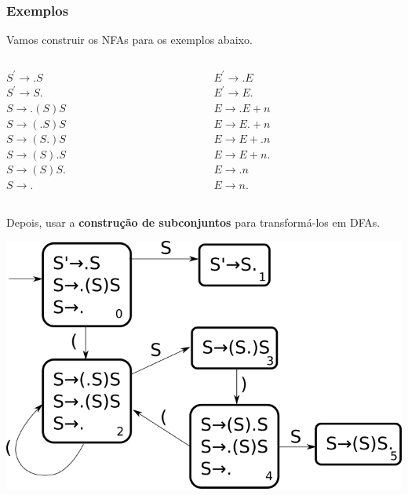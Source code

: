 \documentclass[table]{beamer}
\begin{document}
\begin{frame}
   \frametitle{Exemplos}
   Vamos construir os NFAs para os exemplos abaixo. \\
   \begin{columns}
   \begin{column}{0.4\textwidth}
   $S^{'}\to.S$  \\ 
   $S^{'}\to S.$ \\
   $S\to.(S)S$   \\
   $S\to(.S)S$   \\
   $S\to(S.)S$   \\
   $S\to(S).S$   \\
   $S\to(S)S.$   \\
   $S\to.$   \\
   \end{column}
   \begin{column}{0.4\textwidth}
   $E^{'}\to.E$   \\
   $E^{'}\to E.$  \\
   $E\to.E + n$   \\
   $E\to E. + n$  \\
   $E\to E +. n$  \\
   $E\to E + n.$  \\
   $E\to .n$      \\
   $E\to n.$      \\
   \end{column}
   \end{columns}
   \vspace{1.0cm}
   Depois, usar a \textbf{construção de subconjuntos} para transformá-los em DFAs.
\end{frame}

\begin{frame}
   \includegraphics[width=\linewidth,height=\textheight,keepaspectratio]{figuras/ssadfa.png}
\end{frame}
\end{document}
